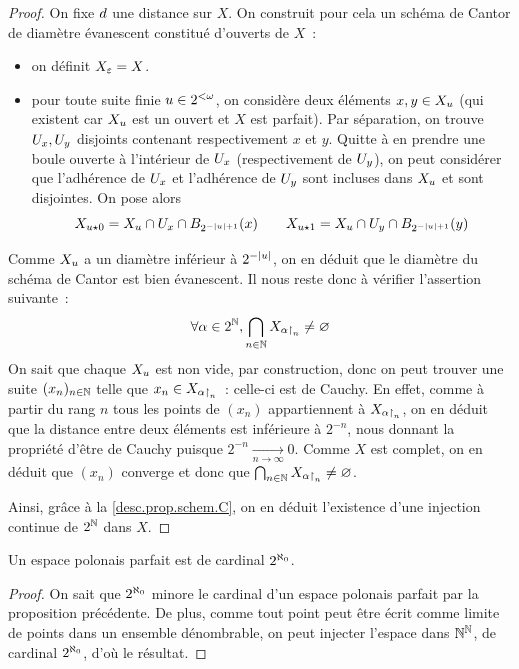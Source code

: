 \begin{proof}
  On fixe $\vardis$ une distance sur $X$.
  On construit pour cela un schéma de Cantor de diamètre évanescent constitué
  d'ouverts de $X$~:
  \begin{itemize}
  \item on définit $X_\Ewd = X$.
  \item pour toute suite finie $\varwd\in 2^{<\Ow}$, on considère deux éléments
    $x,y\in X_\varwd$ (qui existent car $X_\varwd$ est un ouvert et $X$ est
    parfait). Par séparation, on trouve $\varOp_x,\varOp_y$ disjoints contenant
    respectivement $x$ et $y$. Quitte à en prendre une boule ouverte à
    l'intérieur de $\varOp_x$ (respectivement de $\varOp_y$), on peut considérer
    que l'adhérence de $\varOp_x$ et l'adhérence de $\varOp_y$ sont incluses
    dans $X_\varwd$ et sont disjointes. On pose alors
    \[X_{\varwd\wdPt 0} = X_\varwd\cap \varOp_x \cap \boule{x}{2^{-|\varwd|+1}}\qquad
    X_{\varwd\wdPt 1} = X_\varwd\cap \varOp_y \cap \boule{y}{2^{-|\varwd|+1}}\]
  \end{itemize}
  Comme $X_\varwd$ a un diamètre inférieur à $2^{-\wul}$, on en déduit que le
  diamètre du schéma de Cantor est bien évanescent. Il nous reste donc à
  vérifier l'assertion suivante~:
  \[\forall \varCan\in 2^\bN,\bigcap_{n \in \bN}X_{\varCan\restr n} \neq\vide\]
  On sait que chaque $X_\varwd$ est non vide, par construction, donc on peut
  trouver une suite $(x_n)_{n\in\bN}$ telle que $x_n\in X_{\varCan\restr n}$~:
  celle-ci est de Cauchy. En effet, comme à partir du rang $n$ tous les points
  de $(x_n)$ appartiennent à $X_{\varCan\restr n}$, on en déduit que la distance
  entre deux éléments est inférieure à $2^{-n}$, nous donnant la propriété
  d'être de Cauchy puisque $2^{-n} \xrightarrow[n\to\infty]{} 0$. Comme $X$ est
  complet, on en déduit que $(x_n)$ converge et donc que
  $\bigcap_{n\in\bN} X_{\varCan\restr n}\neq\vide$.

  Ainsi, grâce à la \cref{desc.prop.schem.C}, on en déduit l'existence
  d'une injection continue de $2^\bN$ dans $X$.
\end{proof}

\begin{corollary}
  Un espace polonais parfait est de cardinal $2^{\Cal_0}$.
\end{corollary}

\begin{proof}
  On sait que $2^{\Cal_0}$ minore le cardinal d'un espace polonais parfait par la
  proposition précédente. De plus, comme tout point peut être écrit comme limite
  de points dans un ensemble dénombrable, on peut injecter l'espace dans
  $\bN^\bN$, de cardinal $2^{\Cal_0}$, d'où le résultat.
\end{proof}

